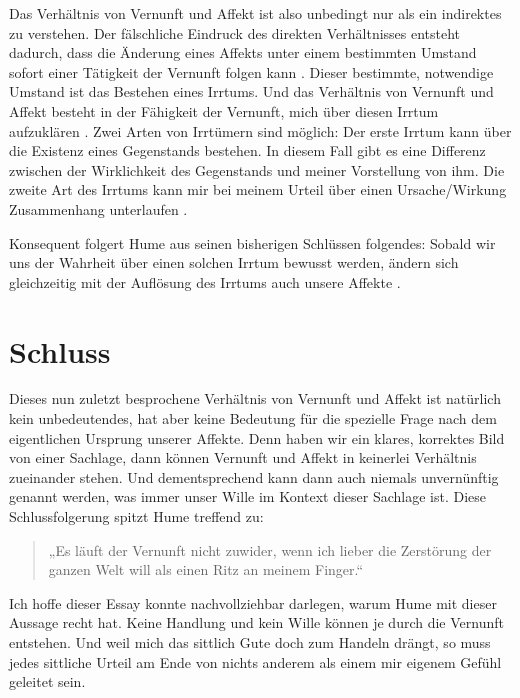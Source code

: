 \documentclass[ngerman,12pt]{diazessay} %
\begin{document}
\begin{doublespace}
Das Verhältnis von Vernunft und Affekt ist also unbedingt nur als ein indirektes zu verstehen. Der fälschliche Eindruck des direkten Verhältnisses entsteht dadurch, dass die Änderung eines Affekts unter einem bestimmten Umstand sofort einer Tätigkeit der Vernunft folgen kann \cite[siehe S.488]{Hume.2013}. Dieser bestimmte, notwendige Umstand ist das Bestehen eines Irrtums. Und das Verhältnis von Vernunft und Affekt besteht in der Fähigkeit der Vernunft, mich über diesen Irrtum aufzuklären \cite[siehe S.536]{Hume.2013}. Zwei Arten von Irrtümern sind möglich: Der erste Irrtum kann über die Existenz eines Gegenstands bestehen. In diesem Fall gibt es eine Differenz zwischen der Wirklichkeit des Gegenstands und meiner Vorstellung von ihm. Die zweite Art des Irrtums kann mir bei meinem Urteil über einen Ursache/Wirkung Zusammenhang unterlaufen \cite[siehe S.536]{Hume.2013}.
\par\bigskip   
Konsequent folgert Hume aus seinen bisherigen Schlüssen folgendes: Sobald wir uns der Wahrheit über einen solchen Irrtum bewusst werden, ändern sich gleichzeitig mit der Auflösung des Irrtums auch unsere Affekte \cite[siehe S.488]{Hume.2013}.


\section{Schluss}

Dieses nun zuletzt besprochene Verhältnis von Vernunft und Affekt ist natürlich kein unbedeutendes, hat aber keine Bedeutung für die spezielle Frage nach dem eigentlichen Ursprung unserer Affekte. Denn haben wir ein klares, korrektes Bild von einer Sachlage, dann können Vernunft und Affekt in keinerlei Verhältnis zueinander stehen. Und dementsprechend kann dann auch niemals unvernünftig genannt werden, was immer unser Wille im Kontext dieser Sachlage ist.
Diese Schlussfolgerung spitzt Hume treffend zu:
\begin{quote}
„Es läuft der Vernunft nicht zuwider,
wenn ich lieber die Zerstörung der ganzen Welt will als einen
Ritz an meinem Finger.“ \cite[siehe S.487]{Hume.2013}
\end{quote}
Ich hoffe dieser Essay konnte nachvollziehbar darlegen, warum Hume mit dieser Aussage recht hat. Keine Handlung und kein Wille können je durch die Vernunft entstehen. Und weil mich das sittlich Gute doch zum Handeln drängt, so muss jedes sittliche Urteil am Ende von nichts anderem als einem mir eigenem Gefühl geleitet sein.
\newpage
\printbibliography


\end{doublespace}
\end{document}

